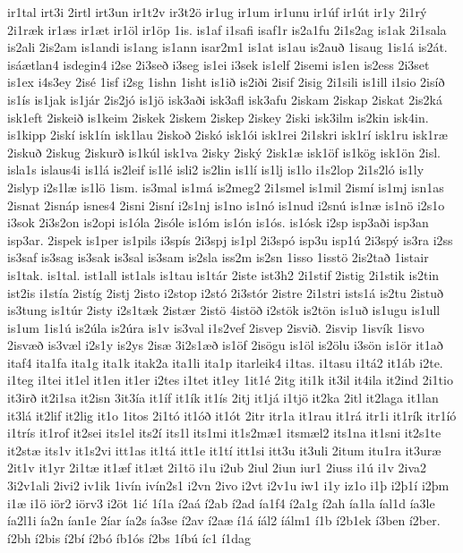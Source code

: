 {ir1tal
irt3i
2irtl
irt3un
ir1t2v
ir3t2ö
ir1ug
ir1um
ir1unu
ir1úf
ir1út
ir1y
2i1rý
2i1ræk
ir1æs
ir1æt
ir1öl
ir1öp
1is.
is1af
i1safi
isaf1r
is2a1fu
2i1s2ag
is1ak
2i1sala
is2ali
2is2am
is1andi
is1ang
is1ann
isar2m1
is1at
is1au
is2auð
1isaug
1is1á
is2át.
isáætlan4
isdegin4
i2se
2i3seð
i3seg
is1ei
i3sek
is1elf
2isemi
is1en
is2ess
2i3set
is1ex
i4s3ey
2isé
1isf
i2sg
1ishn
1isht
is1ið
is2iði
2isif
2isig
2i1sili
is1ill
i1sio
2isíð
is1ís
is1jak
is1jár
2is2jó
is1jö
isk3aði
isk3afl
isk3afu
2iskam
2iskap
2iskat
2is2ká
isk1eft
2iskeið
is1keim
2iskek
2iskem
2iskep
2iskey
2iski
isk3ilm
is2kin
isk4in.
is1kipp
2iskí
isk1ín
isk1lau
2iskoð
2iskó
isk1ói
isk1rei
2i1skri
isk1rí
isk1ru
isk1ræ
2iskuð
2iskug
2iskurð
is1kúl
isk1va
2isky
2iský
2isk1æ
isk1öf
is1kög
isk1ön
2isl.
isla1s
islaus4i
is1lá
is2leif
is1lé
isli2
is2lin
is1lí
is1lj
is1lo
i1s2lop
2i1s2ló
is1ly
2islyp
i2s1læ
is1lö
1ism.
is3mal
is1má
is2meg2
2i1smel
is1mil
2ismí
is1mj
isn1as
2isnat
2isnáp
isnes4
2isni
2isní
i2s1nj
is1no
is1nó
is1nud
i2snú
is1næ
is1nö
i2s1o
i3sok
2i3s2on
is2opi
is1óla
2isóle
is1óm
is1ón
is1ós.
is1ósk
i2sp
isp3aði
isp3an
isp3ar.
2ispek
is1per
is1pils
i3spís
2i3spj
is1pl
2i3spó
isp3u
isp1ú
2i3spý
is3ra
i2ss
is3saf
is3sag
is3sak
is3sal
is3sam
is2sla
iss2m
is2sn
1isso
1isstö
2is2tað
1istair
is1tak.
is1tal.
ist1all
ist1als
is1tau
is1tár
2iste
ist3h2
2i1stif
2istig
2i1stik
is2tin
ist2is
i1stía
2istíg
2istj
2isto
i2stop
i2stó
2i3stór
2istre
2i1stri
ists1á
is2tu
2istuð
is3tung
is1túr
2isty
i2s1tæk
2istær
2istö
4istöð
i2stök
is2tön
is1uð
is1ugu
is1ull
is1um
1is1ú
is2úla
is2úra
is1v
is3val
i1s2vef
2isvep
2isvið.
2isvip
1isvík
1isvo
2isvæð
is3væl
i2s1y
is2ys
2isæ
3i2s1æð
is1öf
2isögu
is1öl
is2ölu
i3sön
is1ör
it1að
itaf4
ita1fa
ita1g
ita1k
itak2a
ita1li
ita1p
itarleik4
i1tas.
i1tasu
i1tá2
it1áb
i2te.
i1teg
i1tei
it1el
it1en
it1er
i2tes
i1tet
it1ey
1it1é
2itg
iti1k
it3il
it4ila
it2ind
2i1tio
it3irð
it2i1sa
it2isn
3it3ía
it1íf
it1ík
it1ís
2itj
it1já
i1tjö
it2ka
2itl
it2laga
it1lan
it3lá
it2lif
it2lig
it1o
1itos
2i1tó
it1óð
it1ót
2itr
itr1a
it1rau
it1rá
itr1i
it1rík
itr1íó
i1trís
it1rof
it2sei
its1el
its2í
its1l
its1mi
it1s2mæ1
itsmæl2
its1na
it1sni
it2s1te
it2stæ
its1v
it1s2vi
itt1as
it1tá
itt1e
it1tí
itt1si
itt3u
it3uli
2itum
itu1ra
it3uræ
2it1v
it1yr
2i1tæ
it1æf
it1æt
2i1tö
i1u
i2ub
2iul
2iun
iur1
2iuss
i1ú
i1v
2iva2
3i2v1ali
2ivi2
iv1ik
1ivín
ivín2s1
i2vn
2ivo
i2vt
i2v1u
iw1
i1y
iz1o
i1þ
i2þ1í
i2þm
i1æ
i1ö
iör2
iörv3
i2öt
1ić
1í1a
í2aá
í2ab
í2ad
ía1f4
í2a1g
í2ah
ía1la
íal1d
ía3le
ía2l1i
ía2n
ían1e
2íar
ía2s
ía3se
í2av
í2aæ
í1á
íál2
íálm1
í1b
í2b1ek
í3ben
í2ber.
í2bh
í2bis
í2bí
í2bó
íb1ós
í2bs
1íbú
íc1
í1dag
}
